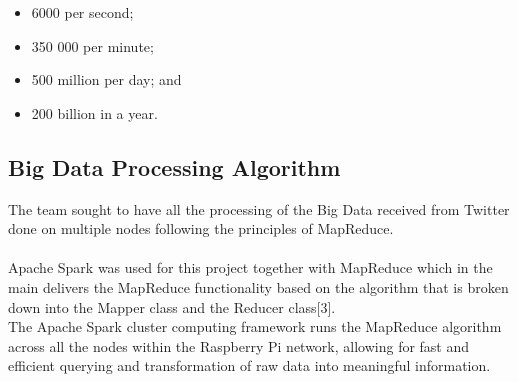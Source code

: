\documentclass[12pt]{article} %
\begin{document}
		\begin{itemize}
			\item 6000 per second; 
			\item 350 000 per minute;
			\item 500 million per day; and
			\item 200 billion in a year.
		\end{itemize}
	
	\subsection {Big Data Processing Algorithm}
	
	The team sought to have all the processing of the Big Data received from Twitter done on multiple nodes following the principles of MapReduce.
	\\
	\\
	Apache Spark was used for this project together with MapReduce which in the main delivers the MapReduce functionality based on the algorithm that is broken down into the Mapper class and the Reducer class[3].\\
	
	The Apache Spark cluster computing framework runs the MapReduce algorithm across all the nodes within the Raspberry Pi network, allowing for fast and efficient querying and transformation of raw data into meaningful information.\\
	\\
	
	

	
	
	
	
	
	
\end{document}
